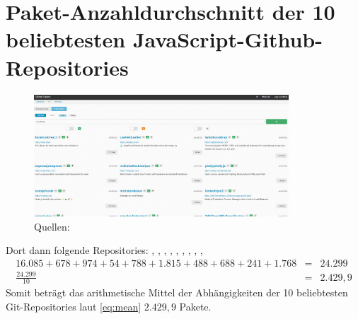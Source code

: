 \section{Paket-Anzahldurchschnitt der 10 beliebtesten JavaScript-Github-Repositories} \label{sec:PackageMeanPopGitJsRepos}
    \begin{figure}[H]
        \centering
        \includegraphics[width=0.85\textwidth]{Appendix/gitmost_wanted_2024-04-29 181855.png}
        \caption{Quellen: \cite{link:GitPopJsRepoMostWanted}}
        \label{png:gitMostWanted}
    \end{figure}
    Dort dann folgende Repositories: \cite{link:GitPopJsRepoReact}, \cite{link:GitPopJsRepoLeaflet}, \cite{link:GitPopJsRepoBootstrap}, \cite{link:GitPopJsRepoExpress}, \cite{link:GitPopJsRepoSwiper}, \cite{link:GitPopJsRepoPlotly}, \cite{link:GitPopJsRepoNode}, \cite{link:GitPopJsRepoAos}, \cite{link:GitPopJsRepoPm2}, \cite{link:GitPopJsRepoAxios}
    \begin{eqnarray}
        16.085 + 678 + 974 + 54 + 788 + 1.815 + 488 + 688 + 241 + 1.768 &=& 24.299
        \label{eq:summe} \\
        \frac{24.299}{10} &=& 2.429,9
        \label{eq:mean}
    \end{eqnarray}
    Somit beträgt das arithmetische Mittel der Abhängigkeiten der 10 beliebtesten Git-Repositories laut \eqref{eq:mean} $2.429,9$ Pakete.
